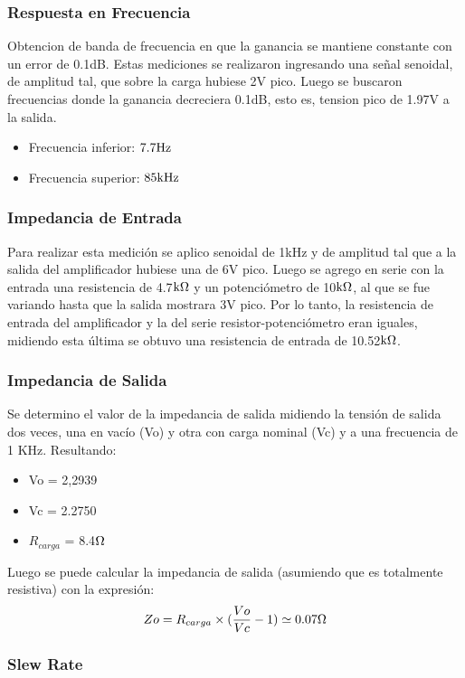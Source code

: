 \medskip
\subsubsection{Respuesta en Frecuencia}
Obtencion de banda de frecuencia en que la ganancia se mantiene constante con un error de 0.1dB.
Estas mediciones se realizaron ingresando una señal senoidal, de amplitud tal, que sobre la carga hubiese 2V pico. Luego se buscaron frecuencias donde la ganancia decreciera 0.1dB, esto es, tension pico de 1.97V a la salida.

\begin{itemize}
\item Frecuencia inferior: $7.7\hertz$
\item Frecuencia superior: $85\khertz$
\end{itemize}


\medskip
\subsubsection{Impedancia de Entrada}

Para realizar esta medición se aplico senoidal de 1kHz y de amplitud tal que a la salida del amplificador hubiese una de 6V pico. Luego se agrego en serie con la entrada una resistencia de 4.7$\kohm$ y un potenciómetro de 10$\kohm$, al que se fue variando hasta que la salida mostrara 3V pico. Por lo tanto, la resistencia de entrada del amplificador y la del serie resistor-potenciómetro eran iguales, midiendo esta última se obtuvo una resistencia de entrada de 10.52$\kohm$.
\medskip
\subsubsection{Impedancia de Salida}

Se determino el valor de la impedancia de salida midiendo la tensión de salida dos veces,
una en vacío (Vo) y otra con carga nominal (Vc) y a una frecuencia de 1 KHz. Resultando:


\begin{itemize}
\item Vo = 2,2939 
\item Vc = 2.2750 
\item $R_{carga}$ = 8.4$\ohm$
\end{itemize}

Luego se puede calcular la impedancia de salida (asumiendo que es totalmente resistiva) con la expresión: 
$$
Zo = R_{carga} \times (\frac{Vo}{Vc} -1) \simeq 0.07 \ohm
$$
\medskip
\subsubsection{Slew Rate}

